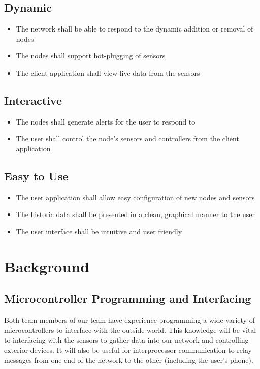 		\subsection{Dynamic}
			\begin{itemize}
				\item The network shall be able to respond to the dynamic addition or removal of nodes
				\item The nodes shall support hot-plugging of sensors
				\item The client application shall view live data from the sensors
			\end{itemize}
			
		\subsection{Interactive}
			\begin{itemize}
				\item The nodes shall generate alerts for the user to respond to
				\item The user shall control the node's sensors and controllers from the client application
			\end{itemize}
		\subsection{Easy to Use}
			\begin{itemize}
				\item The user application shall allow easy configuration of new nodes and sensors
				\item The historic data shall be presented in a clean, graphical manner to the user
				\item The user interface shall be intuitive and user friendly
			\end{itemize}
			
	\section{Background}
		\subsection{Microcontroller Programming and Interfacing}
			Both team members of our team have experience programming a wide variety of microcontrollers to interface with the outside world. This knowledge will be vital to interfacing with the sensors to gather data into our network and controlling exterior devices. It will also be useful for interprocessor communication to relay messages from one end of the network to the other (including the user's phone).
		
